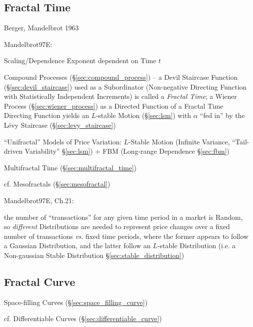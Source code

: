 \subsection{Fractal Time}\label{sec:fractal_time}

Berger, Mandelbrot 1963

Mandelbrot97E:

Scaling/Dependence Exponent dependent on Time $t$

Compound Processes (\S\ref{sec:compound_process}) -- a Devil Staircase Function
(\S\ref{sec:devil_staircase}) used as a Subordinator (Non-negative Directing
Function with Statistically Independent Increments) is called a \emph{Fractal
  Time}; a Wiener Process (\S\ref{sec:wiener_process}) as a Directed Function of
a Fractal Time Directing Function yields an $L$-stable Motion (\S\ref{sec:lsm})
with $\alpha$ ``fed in'' by the L\'evy Staircase (\S\ref{sec:levy_staircase})

``Unifractal'' Models of Price Variation: $L$-Stable Motion
(Infinite Variance, ``Tail-driven Variability'' \S\ref{sec:lsm}) + FBM
(Long-range Dependence \S\ref{sec:fbm})

\fist Multifractal Time (\S\ref{sec:multifractal_time})

cf. Mesofractals (\S\ref{sec:mesofractal})

Mandelbrot97E, Ch.21:

the number of ``transactions'' for any given time period in a market is Random,
so \emph{different} Distributions are needed to represent price changes over a
fixed number of transactions \emph{vs.} fixed time periods, where the former
appears to follow a Gaussian Distribution, and the latter follow an $L$-stable
Distribution (i.e. a Non-gaussian Stable Distribution
\S\ref{sec:stable_distribution})



\subsection{Fractal Curve}\label{sec:fractal_curve}

Space-filling Curves (\S\ref{sec:space_filling_curve})

cf. Differentiable Curves (\S\ref{sec:differentiable_curve})



